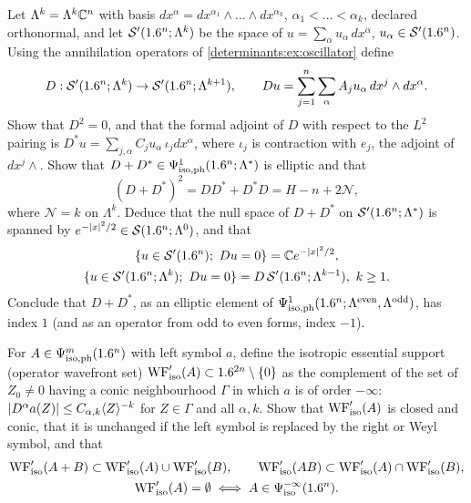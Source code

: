 \begin{exercise}\label{determinants:ex:koszul}
  Let $\Lambda^k=\Lambda^k\mathbb{C}^n$ with basis $dx^\alpha=dx^{\alpha_1}\wedge\dots\wedge dx^{\alpha_k}$,
  $\alpha_1<\dots<\alpha_k$, declared orthonormal, and let
  $\mathcal{S}'(1.6^n;\Lambda^k)$ be the space of $u=\sum_\alpha u_\alpha\,dx^\alpha$,
  $u_\alpha\in\mathcal{S}'(1.6^n)$. Using the annihilation operators of
  \cref{determinants:ex:oscillator} define
  \begin{equation*}
    D:\mathcal{S}'(1.6^n;\Lambda^k)\to\mathcal{S}'(1.6^n;\Lambda^{k+1}),\qquad Du=\sum_{j=1}^n\sum_\alpha A_ju_\alpha\,dx^j\wedge dx^\alpha .
  \end{equation*}
  Show that $D^2=0$, and that the formal adjoint of $D$ with respect to the
  $L^2$ pairing is $D^*u=\sum_{j,\alpha}C_ju_\alpha\,\iota_j dx^\alpha$, where
  $\iota_j$ is contraction with $e_j$, the adjoint of $dx^j\wedge$. Show that
  $D+D^*\in\Psi^{1}_{\mathrm{iso,ph}}(1.6^n;\Lambda^*)$ is elliptic and that
  \begin{equation*}
    (D+D^*)^2=DD^*+D^*D=H-n+2\mathcal N,
  \end{equation*}
  where $\mathcal N=k$ on $\Lambda^k$. Deduce that the null space of $D+D^*$
  on $\mathcal{S}'(1.6^n;\Lambda^*)$ is spanned by $e^{-\lvert x\rvert^2/2}\in\mathcal{S}(1.6^n;\Lambda^0)$,
  and that
  \begin{gather*}
    \{u\in\cSp(\R^n);\ Du=0\}=\C e^{-\abs{x}^2/2},\\
    \{u\in\cSp(\R^n;\Lambda^k);\ Du=0\}=D\,\cSp(\R^n;\Lambda^{k-1}),\ k\ge1 .
  \end{gather*}
  Conclude that $D+D^*$, as an elliptic element of
  $\Psi^{1}_{\mathrm{iso,ph}}(1.6^n;\Lambda^{\mathrm{even}},\Lambda^{\mathrm{odd}})$, has index
  $1$ (and as an operator from odd to even forms, index $-1$).
\end{exercise}

\begin{exercise}\label{determinants:ex:ess-supp}
  For $A\in\Psi^{m}_{\mathrm{iso,ph}}(1.6^n)$ with left symbol $a$, define the isotropic
  essential support (operator wavefront set) $\operatorname{WF}_{\mathrm{iso}}'(A)\subset1.6^{2n}\setminus\{0\}$
  as the complement of the set of $Z_0\ne0$ having a conic neighbourhood
  $\Gamma$ in which $a$ is of order $-\infty$:
  $\lvert D^\alpha a(Z)\rvert\le C_{\alpha,k}\langle Z\rangle^{-k}$ for $Z\in\Gamma$ and all
  $\alpha,k$. Show that $\operatorname{WF}_{\mathrm{iso}}'(A)$ is closed and conic, that it is unchanged if
  the left symbol is replaced by the right or Weyl symbol, and that
  \begin{gather*}
    \operatorname{WF}_{\mathrm{iso}}'(A+B)\subset\operatorname{WF}_{\mathrm{iso}}'(A)\cup\operatorname{WF}_{\mathrm{iso}}'(B),\qquad\operatorname{WF}_{\mathrm{iso}}'(AB)\subset\operatorname{WF}_{\mathrm{iso}}'(A)\cap\operatorname{WF}_{\mathrm{iso}}'(B),\\
    \operatorname{WF}_{\mathrm{iso}}'(A)=\emptyset\iff A\in\Psi^{-\infty}_{\mathrm{iso}}(1.6^n).
  \end{gather*}
\end{exercise}

